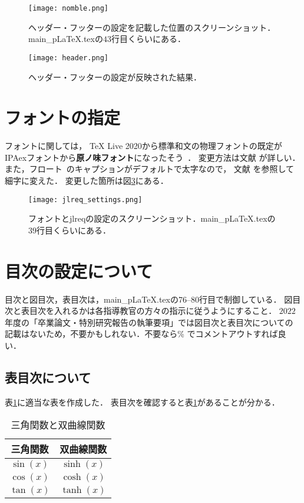 \begin{figure}[h]
  \centering
  \texttt{[image: nomble.png]}
  \caption{ヘッダー・フッターの設定を記載した位置のスクリーンショット．main\_pLaTeX.texの$43$行目くらいにある．}
  \label{fig:nomble}
\end{figure}
\begin{figure}[h]
  \centering
  \texttt{[image: header.png]}
  \caption{ヘッダー・フッターの設定が反映された結果．}
  \label{fig:header}
\end{figure}


\section{フォントの指定}
フォントに関しては，
TeX Live 2020から標準和文の物理フォントの既定が
IPAexフォントから\textbf{\textsf{原ノ味フォント}}になったそう~\cite{font}．
変更方法は文献 \cite{font} が詳しい．
また，フロート~\cite{float}のキャプションがデフォルトで太字なので，
文献 \cite{jlreq} を参照して細字に変えた．
変更した箇所は図\ref{fig:jlreqset}にある．

\begin{figure}[h]
  \centering
  \texttt{[image: jlreq\_settings.png]}
  \caption{フォントとjlreqの設定のスクリーンショット．main\_pLaTeX.texの$39$行目くらいにある．}
  \label{fig:jlreqset}
\end{figure}


\section{目次の設定について}
目次と図目次，表目次は，main\_pLaTeX.texの76--80行目で制御している．
図目次と表目次を入れるかは各指導教官の方々の指示に従うようにすること．
$2022$年度の「卒業論文・特別研究報告の執筆要項」では図目次と表目次についての
記載はないため，不要かもしれない．不要なら\% でコメントアウトすれば良い．

\subsection{表目次について}
表\ref{tab:triangle}に適当な表を作成した．
表目次を確認すると表\ref{tab:triangle}があることが分かる．

\begin{table}[htbp]
  \centering
  \caption{三角関数と双曲線関数}
  \begin{tabular}{cc} \hline 
    三角関数 & 双曲線関数 \\ \hline
    $\sin(x)$ & $\sinh(x)$ \\
    $\cos(x)$ & $\cosh(x)$ \\
    $\tan(x)$ & $\tanh(x)$ \\ \hline
  \end{tabular}
  \label{tab:triangle}
\end{table}


